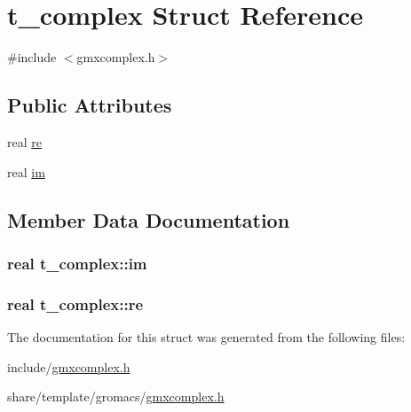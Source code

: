 \hypertarget{structt__complex}{\section{t\-\_\-complex \-Struct \-Reference}
\label{structt__complex}
}


{\ttfamily \#include $<$gmxcomplex.\-h$>$}

\subsection*{\-Public \-Attributes}
\begin{DoxyCompactItemize}
\item 
real \hyperlink{structt__complex_afb65273a89b04f90baebbaad9fa92dcb}{re}
\item 
real \hyperlink{structt__complex_a6a34d6f5d7bc60ccafc5e1494f9aade5}{im}
\end{DoxyCompactItemize}


\subsection{\-Member \-Data \-Documentation}
\hypertarget{structt__complex_a6a34d6f5d7bc60ccafc5e1494f9aade5}{
\subsubsection[{im}]{\setlength{\rightskip}{0pt plus 5cm}real {\bf t\-\_\-complex\-::im}}}\label{structt__complex_a6a34d6f5d7bc60ccafc5e1494f9aade5}
\hypertarget{structt__complex_afb65273a89b04f90baebbaad9fa92dcb}{
\subsubsection[{re}]{\setlength{\rightskip}{0pt plus 5cm}real {\bf t\-\_\-complex\-::re}}}\label{structt__complex_afb65273a89b04f90baebbaad9fa92dcb}


\-The documentation for this struct was generated from the following files\-:\begin{DoxyCompactItemize}
\item 
include/\hyperlink{include_2gmxcomplex_8h}{gmxcomplex.\-h}\item 
share/template/gromacs/\hyperlink{share_2template_2gromacs_2gmxcomplex_8h}{gmxcomplex.\-h}\end{DoxyCompactItemize}
